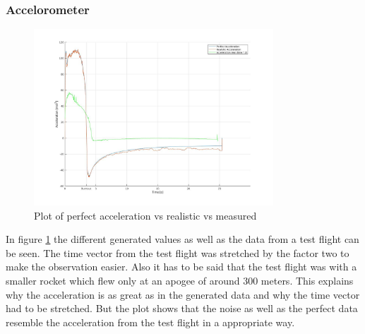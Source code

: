 \subsubsection{Accelorometer}
\begin{figure}[h!]
 \centering
 \includegraphics[width=0.8\textwidth]{./Pictures/AccelPerfVSReal.jpg}
 \caption{Plot of perfect acceleration vs realistic vs measured}
 \label{fig:AccelPerfVsReal}
\end{figure}
In figure \ref{fig:AccelPerfVsReal} the different generated values as well as the data from a test flight can be seen.
The time vector from the test flight was stretched by the factor two to make the observation easier.
Also it has to be said that the test flight was with a smaller rocket which flew only at an apogee of around 300 meters.
This explains why the acceleration is as great as in the generated data and why the time vector had to be stretched.
But the plot shows that the noise as well as the perfect data resemble the acceleration from the test flight in a appropriate way.


